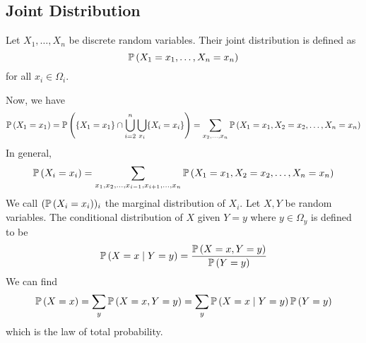 \subsection{Joint Distribution}
\begin{definition}
	Let \(X_1, \dots, X_n\) be discrete random variables.
	Their joint distribution is defined as
	\[
		\mathbb{P}\left({X_1 = x_1, \dots, X_n = x_n}\right)
	\]
	for all \(x_i \in \Omega_i\).
\end{definition}
\noindent Now, we have
\[
	\mathbb{P}\left({X_1 = x_1}\right) = \mathbb{P}\left({\{ X_1 = x_1\} \cap \bigcup_{i=2}^n \bigcup_{x_i} \{ X_i = x_i \} }\right) = \sum_{x_2, \dots, x_n} \mathbb{P}\left({X_1 = x_1, X_2 = x_2, \dots, X_n = x_n}\right)
\]
In general,
\[
	\mathbb{P}\left({X_i = x_i}\right) = \sum_{x_1, x_2, \dots, x_{i-1}, x_{i+1}, \dots, x_n} \mathbb{P}\left({X_1 = x_1, X_2 = x_2, \dots, X_n = x_n}\right)
\]
We call \((\mathbb{P}\left({X_i = x_i}\right))_i\) the marginal distribution of \(X_i\).
Let \(X, Y\) be random variables.
The conditional distribution of \(X\) given \(Y = y\) where \(y \in \Omega_y\) is defined to be
\[
	\mathbb{P}\left({X = x \mid Y = y}\right) = \frac{\mathbb{P}\left({X = x, Y = y}\right)}{\mathbb{P}\left({Y = y}\right)}
\]
We can find
\[
	\mathbb{P}\left({X = x}\right) = \sum_y \mathbb{P}\left({X = x, Y = y}\right) = \sum_y \mathbb{P}\left({X = x \mid Y = y}\right) \mathbb{P}\left({Y = y}\right)
\]
which is the law of total probability.

